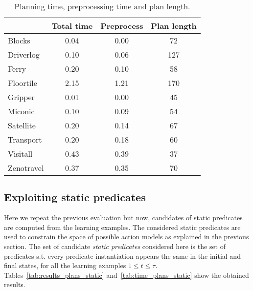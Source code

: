 \documentclass[letterpaper]{article} %
\begin{document}
\begin{table}[hbt!]
\begin{footnotesize}
	\begin{center}
		\begin{tabular}{l|c|c|c|}			
			 & Total time & Preprocess & Plan length  \\
			\hline
			Blocks & 0.04 & 0.00 & 72 \\
			Driverlog & 0.10 & 0.06 & 127 \\
			Ferry & 0.20 & 0.10 & 58 \\
			Floortile & 2.15 & 1.21 & 170 \\
			Gripper & 0.01 & 0.00 & 45 \\
			Miconic & 0.10 & 0.09 & 54 \\
			Satellite & 0.20 & 0.14 & 67 \\
			Transport & 0.20 & 0.18 & 60 \\
			Visitall & 0.43 & 0.39 & 37 \\
			Zenotravel & 0.37 & 0.35 & 70			
		\end{tabular}
	\end{center}
        \end{footnotesize}
	\caption{\small Planning time, preprocessing time and plan length.}
	\label{tab:time_plans}	
\end{table}

\subsection{Exploiting static predicates}
Here we repeat the previous evaluation but now, candidates of static predicates are computed from the learning examples. The considered static predicates are used to constrain the space of possible action models as explained in the previous section. The set of candidate {\em static predicates} considered  here is the set of predicates s.t. every predicate instantiation appears the same in the initial and final states, for all the learning examples {\small $1\leq t\leq \tau$}. Tables~\ref{tab:results_plans_static} and~\ref{tab:time_plans_static} show the obtained results.	
\end{document}

